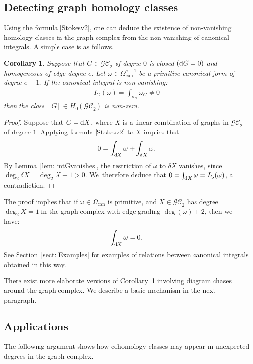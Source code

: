 \documentclass[pdftex]{sigma}%
\newtheorem{cor}[thm]{Corollary}
\numberwithin{equation}{section}
\newcommand{\GC}{\mathcal{GC}}
\newcommand{\can}{\mathrm{can}}
\newcommand{\0}{\color{blue}{\mathsf{0}}}
\begin{document}
 \subsection{Detecting graph homology classes}
 Using the formula \eqref{Stokesv2}, one can deduce the existence of non-vanishing homology classes in the graph complex from the
 non-vanishing of canonical integrals. A simple case is as follows.

 \begin{cor} \label{cor: IGnonzero}
 Suppose that $G\in \GC_2$ of degree $0$ is closed $({\rm d}G =0)$ and homogeneous of edge degree $e$. Let $\omega \in \Omega^{e-1}_{\can}$ be a primitive canonical form of degree $e-1$. If the canonical integral is non-vanishing:
 \begin{gather*}
 I_{G}(\omega) = \int_{\sigma_G} \omega_G \neq 0
 \end{gather*}
 then the class $[G]\in H_0(\GC_2)$ is non-zero.
 \end{cor}
 \begin{proof}
 Suppose that $G = {\rm d}X$, where $X$ is a linear combination of graphs in $\GC_2$ of degree $1$. Applying formula \eqref{Stokesv2} to $X$ implies that
 \begin{gather*}
 0 = \int_{{\rm d}X} \omega + \int_{\delta X} \omega.
 \end{gather*}
 By Lemma~\ref{lem: intGvanishes}, the restriction of $\omega$ to $\delta X$ vanishes, since $\deg_2 \delta X= \deg_2 X+1 >0$. We~there\-fore deduce that $0 = \int_{{\rm d}X} \omega=I_G(\omega)$, a contradiction.
 \end{proof}
 The proof implies that if $\omega \in \Omega_{\can}$ is primitive, and $X \in \GC_2$ has degree $\deg_2 X=1$ in the graph complex with edge-grading $\deg(\omega)+2$, then we have:
 \begin{gather} \label{IomegaRelations}
 \int_{{\rm d}X} \omega=0.
 \end{gather}
 See Section~\ref{sect: Examples} for examples of relations between canonical integrals obtained in this way.

There exist more elaborate versions of Corollary~\ref{cor: IGnonzero} involving diagram chases around the graph complex.
We describe a basic mechanism in the next paragraph.

\subsection{Applications} \label{sect: precip} The following argument shows how cohomology classes may appear in unexpected degrees in the graph complex.
\end{document}
